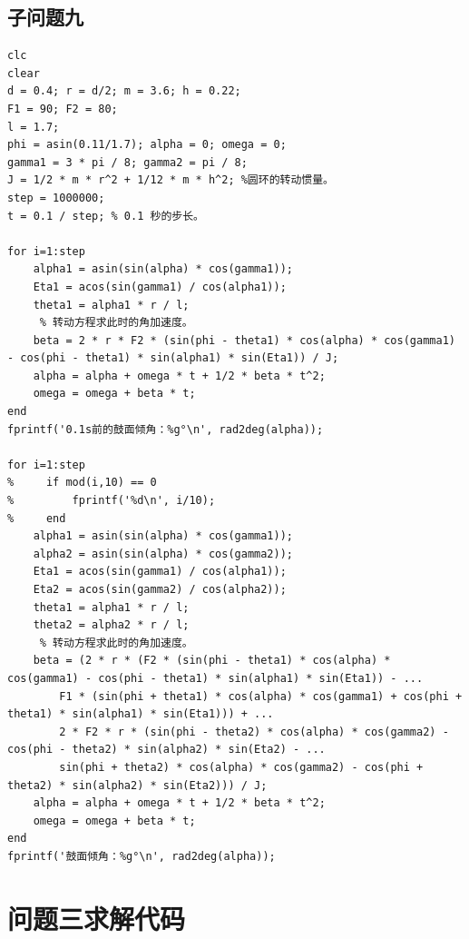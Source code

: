 \documentclass{cumcm}
\begin{document}
\subsection{子问题九}
\begin{lstlisting}
clc
clear
d = 0.4; r = d/2; m = 3.6; h = 0.22;
F1 = 90; F2 = 80;
l = 1.7;
phi = asin(0.11/1.7); alpha = 0; omega = 0;
gamma1 = 3 * pi / 8; gamma2 = pi / 8;
J = 1/2 * m * r^2 + 1/12 * m * h^2; %圆环的转动惯量。
step = 1000000;
t = 0.1 / step; % 0.1 秒的步长。

for i=1:step
    alpha1 = asin(sin(alpha) * cos(gamma1));
    Eta1 = acos(sin(gamma1) / cos(alpha1));
    theta1 = alpha1 * r / l;
     % 转动方程求此时的角加速度。
    beta = 2 * r * F2 * (sin(phi - theta1) * cos(alpha) * cos(gamma1) - cos(phi - theta1) * sin(alpha1) * sin(Eta1)) / J;
    alpha = alpha + omega * t + 1/2 * beta * t^2;
    omega = omega + beta * t;
end
fprintf('0.1s前的鼓面倾角：%g°\n', rad2deg(alpha));

for i=1:step
%     if mod(i,10) == 0
%         fprintf('%d\n', i/10);
%     end
    alpha1 = asin(sin(alpha) * cos(gamma1));
    alpha2 = asin(sin(alpha) * cos(gamma2));
    Eta1 = acos(sin(gamma1) / cos(alpha1));
    Eta2 = acos(sin(gamma2) / cos(alpha2));
    theta1 = alpha1 * r / l;
    theta2 = alpha2 * r / l;
     % 转动方程求此时的角加速度。
    beta = (2 * r * (F2 * (sin(phi - theta1) * cos(alpha) * cos(gamma1) - cos(phi - theta1) * sin(alpha1) * sin(Eta1)) - ...
        F1 * (sin(phi + theta1) * cos(alpha) * cos(gamma1) + cos(phi + theta1) * sin(alpha1) * sin(Eta1))) + ...
        2 * F2 * r * (sin(phi - theta2) * cos(alpha) * cos(gamma2) - cos(phi - theta2) * sin(alpha2) * sin(Eta2) - ...
        sin(phi + theta2) * cos(alpha) * cos(gamma2) - cos(phi + theta2) * sin(alpha2) * sin(Eta2))) / J;
    alpha = alpha + omega * t + 1/2 * beta * t^2;
    omega = omega + beta * t;
end
fprintf('鼓面倾角：%g°\n', rad2deg(alpha));
\end{lstlisting}

\section{问题三求解代码}
\end{document}
